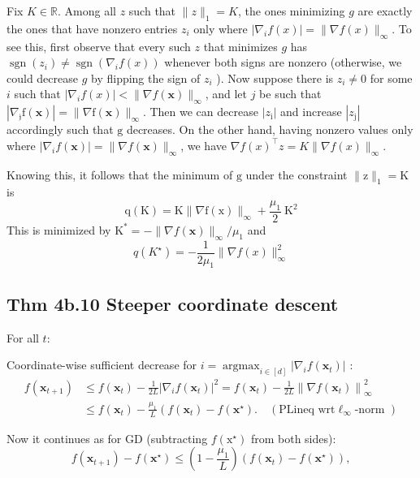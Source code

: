 Fix $K \in \mathbb{R}$. Among all $z$ such that $\|z\|_{1}=K$, the ones minimizing $g$ are exactly the ones that have nonzero entries $z_{i}$ only where $\left|\nabla_{i} f(x)\right|=\|\nabla f(x)\|_{\infty}$. To see this, first observe that every such $z$ that minimizes $g$ has $\operatorname{sgn}\left(z_{i}\right) \neq \operatorname{sgn}\left(\nabla_{i} f(x)\right)$ whenever both signs are nonzero (otherwise, we could decrease $g$ by flipping the sign of $z_{i}$ ). Now suppose there is $z_{i} \neq 0$ for some $i$ such that $\left|\nabla_{i} f(x)\right|<\|\nabla f(\mathbf{x})\|_{\infty}$, and let $j$ be such that $\left|\nabla_{\mathfrak{j}} \mathrm{f}(\mathbf{x})\right|=\|\nabla \mathrm{f}(\mathbf{x})\|_{\infty}$. Then we can decrease $\left|z_{\mathrm{i}}\right|$ and increase $\left|z_{\mathrm{j}}\right|$ accordingly such that $\mathrm{g}$ decreases. On the other hand, having nonzero values only where $\left|\nabla_{i} f(\mathbf{x})\right|=\|\nabla f(\mathbf{x})\|_{\infty}$, we have $\nabla f(x)^{\top} z=K\|\nabla f(x)\|_{\infty}$.

Knowing this, it follows that the minimum of $\mathrm{g}$ under the constraint $\|\mathrm{z}\|_{1}=\mathrm{K}$ is
$$
\mathrm{q}(\mathrm{K})=\mathrm{K}\|\nabla \mathrm{f}(\mathrm{x})\|_{\infty}+\frac{\mu_{1}}{2} \mathrm{~K}^{2}
$$
This is minimized by $\mathrm{K}^{*}=-\|\nabla f(\mathbf{x})\|_{\infty} / \mu_{1}$ and
$$
q\left(K^{\star}\right)=-\frac{1}{2 \mu_{1}}\|\nabla f(x)\|_{\infty}^{2}
$$



\subsection*{Thm 4b.10 Steeper coordinate descent}
For all $t$:

Coordinate-wise sufficient decrease for $i=\operatorname{argmax}_{i \in[d]}\left|\nabla_{i} f\left(\mathbf{x}_{t}\right)\right|$ :
$$
\begin{aligned}
f\left(\mathbf{x}_{t+1}\right) & \leq f\left(\mathbf{x}_{t}\right)-\frac{1}{2 L}\left|\nabla_{i} f\left(\mathbf{x}_{t}\right)\right|^{2}=f\left(\mathbf{x}_{t}\right)-\frac{1}{2 L}\left\|\nabla f\left(\mathbf{x}_{t}\right)\right\|_{\infty}^{2} \\
& \leq f\left(\mathbf{x}_{t}\right)-\frac{\mu_{1}}{L}\left(f\left(\mathbf{x}_{t}\right)-f\left(\mathbf{x}^{\star}\right) . \quad\left(\mathrm{PL} \text {ineq wrt} \ell_{\infty} \text {-norm }\right)\right.
\end{aligned}
$$

Now it continues as for GD (subtracting $f\left(\mathrm{x}^{\star}\right)$ from both sides):
$$
f\left(\mathbf{x}_{t+1}\right)-f\left(\mathbf{x}^{\star}\right) \leq\left(1-\frac{\mu_{1}}{L}\right)\left(f\left(\mathbf{x}_{t}\right)-f\left(\mathbf{x}^{\star}\right)\right),
$$





